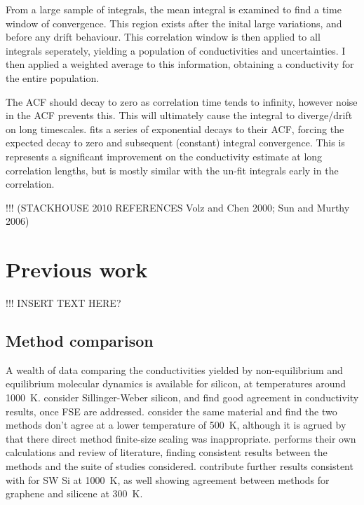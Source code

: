 From a large sample of integrals, the mean integral is examined to find a time window of convergence. This region exists after the inital large variations, and before any drift behaviour. This correlation window is then applied to all integrals seperately, yielding a population of conductivities and uncertainties. I then applied a weighted average to this information, obtaining a conductivity for the entire population.

The ACF should decay to zero as correlation time tends to infinity, however noise in the ACF prevents this. This will ultimately cause the integral to diverge/drift on long timescales. \citet{Howell2012} fits a series of exponential decays to their ACF, forcing the expected decay to zero and subsequent (constant) integral convergence. This is represents a significant improvement on the conductivity estimate at long correlation lengths, but is mostly similar with the un-fit integrals early in the correlation.

!!! (STACKHOUSE 2010 REFERENCES Volz and Chen 2000; Sun and Murthy 2006)



\section{Previous work}

!!! INSERT TEXT HERE?

\subsection{Method comparison}

A wealth of data comparing the conductivities yielded by non-equilibrium and equilibrium molecular dynamics is available for silicon, at temperatures around 1000~K. \citet{Schelling2002} consider Sillinger-Weber silicon, and find good agreement in conductivity results, once FSE are addressed. \citet{Sellan2010} consider the same material and find the two methods don't agree at a lower temperature of 500~K, although it is agrued by \citet{Howell2012} that there direct method finite-size scaling was inappropriate. \citeauthor{Howell2012} performs their own calculations and review of literature, finding consistent results between the methods and the suite of studies considered. \citet{Wang2017} contribute further results consistent with \citeauthor{Howell2012} for SW Si at 1000~K, as well showing agreement between methods for graphene and silicene at 300~K. 

